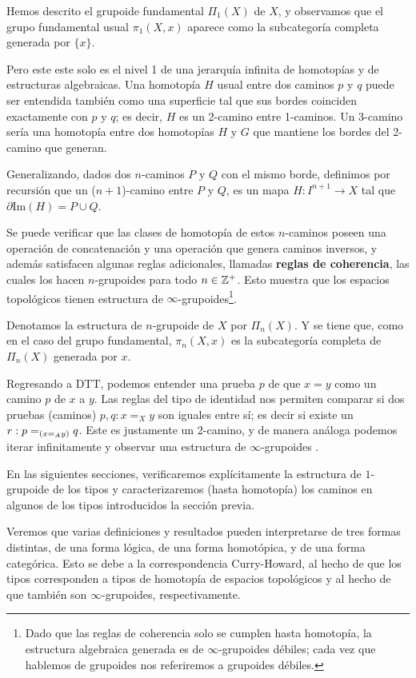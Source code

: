 \documentclass[../main.tex]{subfiles}
\begin{document}
Hemos descrito el grupoide fundamental $\Pi_1(X)$ de $X$, y observamos que el grupo fundamental usual $\pi_1(X,x)$ aparece como la subcategor\'ia completa generada por $\{x\}$.

Pero este este solo es el nivel 1 de una jerarquía infinita de homotop\'ias y de estructuras algebraicas.
Una homotop\'ia $H$ usual entre dos caminos $p$ y $q$ puede ser entendida también como una superficie tal que sus bordes coinciden exactamente con $p$ y $q$; es decir, $H$ es un 2-camino entre 1-caminos. Un 3-camino ser\'ia una homotop\'ia entre dos homotop\'ias $H$ y $G$ que mantiene los bordes del 2-camino que generan.

Generalizando, dados dos $n$-caminos $P$ y $Q$ con el mismo borde, definimos por recursi\'on que un ($n+1$)-camino entre $P$ y $Q$, es un mapa $H:I^{n+1}\to X$ tal que $\partial \text{Im}(H)=P \cup Q$.

Se puede verificar que las clases de homotop\'ia de estos $n$-caminos poseen una operación de concatenaci\'on y una operaci\'on que genera caminos inversos, y adem\'as satisfacen algunas reglas adicionales, llamadas \textbf{reglas de coherencia}, las cuales los hacen $n$-grupoides para todo $n \in \Z^+$.
Esto muestra que los espacios topol\'ogicos tienen estructura de $\infty$-grupoides\footnote{Dado que las reglas de coherencia solo se cumplen hasta homotop\'ia, la estructura algebraica generada es de $\infty$-grupoides d\'ebiles; cada vez que hablemos de grupoides nos referiremos a grupoides d\'ebiles.}.

Denotamos la estructura de $n$-grupoide de $X$ por $\Pi_n(X)$.
Y se tiene que, como en el caso del grupo fundamental, $\pi_n(X,x)$ es la subcategor\'ia completa de $\Pi_n(X)$ generada por $x$.

Regresando a DTT, podemos entender una prueba $p$ de que $x=y$ como un camino $p$ de $x$ a $y$.
Las reglas del tipo de identidad nos permiten comparar si dos pruebas (caminos) $p,q:x=_X y$ son iguales entre s\'i; es decir si existe un $r : \id[{(\id[A]{x}{y})}]{p}{q}$. Este es justamente un 2-camino, y de manera an\'aloga podemos iterar infinitamente y observar una estructura de $\infty$-grupoides \cite{curien_weak_2009} \cite{van_den_berg_types_2011}.

En las siguientes secciones, verificaremos expl\'icitamente la estructura de $1$-grupoide de los tipos y caracterizaremos (hasta homotop\'ia) los caminos en algunos de los tipos introducidos la secci\'on previa.

Veremos que varias definiciones y resultados pueden interpretarse de tres formas distintas, de una forma l\'ogica, de una forma homot\'opica, y de una forma categ\'orica.
Esto se debe a la correspondencia Curry-Howard, al hecho de que los tipos corresponden a tipos de homotop\'ia de espacios topológicos y al hecho de que también son $\infty$-grupoides, respectivamente.
\end{document}
